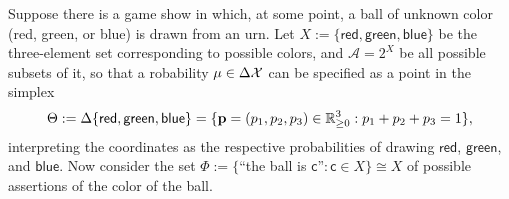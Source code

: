 \documentclass{article}
\begin{document}
\begin{examplex}
    \def\red{{\mathsf{red}}}
    \def\green{{\mathsf{green}}}
    \def\blue{{\mathsf{blue}}}
Suppose there is a game show in which, at some point, a ball of unknown color
(red, green, or blue) is drawn from an urn.
Let  $X := \{ \red,\green,\blue \}$ be the three-element set corresponding to possible colors,
 and $\mathcal A = 2^X$ be all possible subsets of it, so that a robability $\mu \in \Delta \mathcal X$
can be specified as a
point in the simplex
$$\Theta
:= \Delta \{ \red,\green,\blue \}
= \{\mat p = (p_1, p_2, p_3)  \in \mathbb R^3_{\ge 0} : p_1 + p_2 + p_3 = 1\},$$
interpreting
the coordinates as the respective probabilities of drawing $\red$, $\green$, and $\blue$.
%
Now consider the set
 $\Phi := \{$``the ball is $\mathsf c$''$ : \mathsf c \in X\} \cong X$ of possible assertions of the color of the ball.


\end{examplex}
\end{document}
